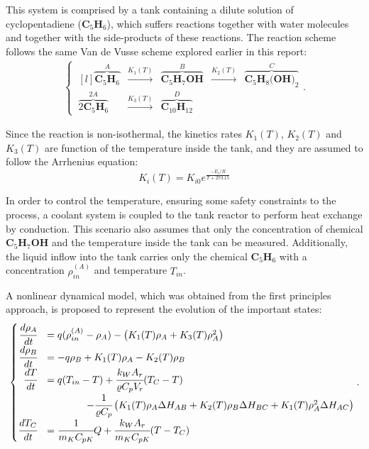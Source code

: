 \documentclass[a4paper,11pt]{book}
\numberwithin{figure}{chapter}
\numberwithin{equation}{chapter}
\numberwithin{table}{chapter}
\theoremstyle{definition}
\begin{document}
This system is comprised by a tank containing a dilute solution of cyclopentadiene ($\textbf{C}_5 \textbf{H}_6$), which suffers reactions together with water molecules and together with the side-products of these reactions. The reaction scheme follows the same Van de Vusse scheme explored earlier in this report:
\begin{align}
\left\{\ \begin{matrix*}[l]
	\overbrace{\textbf{C}_5 \textbf{H}_6}^{A} & \overset{K_1(T)}{\longrightarrow} & \overbrace{\textbf{C}_5 \textbf{H}_7 \textbf{OH}}^{B} & \overset{K_2(T)}{\longrightarrow} & \overbrace{\textbf{C}_5 \textbf{H}_8 \textbf{(OH)}_2}^{C} \\ 
	\overbrace{2 \textbf{C}_5 \textbf{H}_6}^{2A} & \overset{K_3(T)}{\longrightarrow} & \overbrace{\textbf{C}_10 \textbf{H}_12}^{D}
\end{matrix*} \right.
.\end{align}

Since the reaction is non-isothermal, the kinetics rates $K_1(T)$, $K_2(T)$ and $K_3(T)$ are function of the temperature inside the tank, and they are assumed to follow the Arrhenius equation:
\begin{equation}
	K_{i}(T) = K_{i0} e^{\frac{-E_i / R}{T+273.15}}
\end{equation}

In order to control the temperature, ensuring some safety constraints to the process, a coolant system is coupled to the tank reactor to perform heat exchange by conduction. This scenario also assumes that only the concentration of chemical $\textbf{C}_5 \textbf{H}_7 \textbf{OH}$ and the temperature inside the tank can be measured. Additionally, the liquid inflow into the tank carries only the chemical $\textbf{C}_5 \textbf{H}_6$ with a concentration $\rho^{(A)}_{in}$ and temperature $T_{in}$.

A nonlinear dynamical model, which was obtained from the first principles approach, is proposed to represent the evolution of the important states:
\begin{align} \label{eq:engellModel}
\begin{cases}
	\hfill \cfrac{d \rho_A}{dt} &= q (\rho^{(A)}_{in} - \rho_A) - \left( K_1(T) \rho_A + K_3(T) \rho^2_A  \right) \\
	\hfill \cfrac{d \rho_B}{dt} &= - q \rho_B + K_1(T) \rho_A - K_2(T) \rho_B \\
	\hfill \cfrac{d T}{dt} &= q(T_{in} - T) + \cfrac{k_W A_r}{\varrho C_p V_r} (T_C - T) \\ & \ \ \ \ \ \ \ \ \ \ \ \ -\cfrac{1}{\varrho C_p} \left( K_1(T) \rho_A \Delta H_{AB} + K_2(T) \rho_B \Delta H_{BC} + K_1(T) \rho_A^2 \Delta H_{AC} \right) \\
	\hfill \cfrac{d T_C}{dt} &= \cfrac{1}{m_K C_{pK}} Q + \cfrac{k_W A_r}{m_K C_{pK}} (T - T_C) 
\end{cases}
.\end{align}
\end{document}
